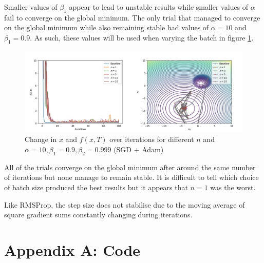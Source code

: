 \documentclass[12pt]{article}
\begin{document}
Smaller values of $\beta_1$ appear to lead to unstable results while smaller values of $\alpha$ fail to converge on the global minimum. The only trial that managed to converge on the global minimum while also remaining stable had values of $\alpha=10$ and $\beta_1=0.9$. As such, these values will be used when varying the batch in figure \ref{fig:c_iv}.

\begin{figure}[h]
    \hspace*{-0.45in}
    \includegraphics[scale=1.75]{figs/c/c_iv.png}
    \caption{Change in $x$ and $f(x, T)$ over iterations for different $n$ and $\alpha=10,\beta_1=0.9,\beta_2=0.999$ (SGD + Adam)}
    \label{fig:c_iv}
\end{figure}

All of the trials converge on the global minimum after around the same number of iterations but none manage to remain stable. It is difficult to tell which choice of batch size produced the best results but it appears that $n=1$ was the worst.

Like RMSProp, the step size does not stabilise due to the moving average of square gradient sums constantly changing during iterations.

\newpage
\section*{Appendix A: Code}

\lstset{basicstyle=\footnotesize,xleftmargin=0in}

\end{document}
